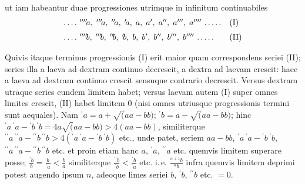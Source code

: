 ut iam habeantur duae progressiones utrimque in infinitum continuabiles
\[
\begin{array}{@{}ll@{}}
.\,.\,.\,.\ {}^{\prime\prime\prime\prime}\!a,\;{}^{\prime\prime\prime}\!a,\;{}^{\prime\prime}\!a,\;{}^{\prime}\!a,\; a,\; a',\; a'',\; a''',\; a''''\ .\,.\,.\,.\,.&\mathrm{(I)}\\[6pt]
.\,.\,.\,.\ {}^{\prime\prime\prime\prime}\!b,\;{}^{\prime\prime\prime}\!b,\;{}^{\prime\prime}\!b,\;{}^{\prime}\!b,\; b,\; b',\; b'',\; b''',\; b''''\ .\,.\,.\,.\,.&\mathrm{(II)}
\end{array}
\]
\par Quivis itaque terminus progressionis (I) erit maior quam correspondens seriei (II); series illa a laeva ad dextram continuo decrescit, a dextra ad laevam
crescit: haec a laeva ad dextram continuo crescit sensuque contrario decrescit.
Versus dextram utraque series eundem limitem habet; versus laevam autem (I)
super omnes limites crescit, (II) habet limitem $0$ (nisi omnes utriusque progressionis termini sunt aequales). Nam ${}^{\prime}\!a=a+\surd(aa-bb)$; ${}^{\prime}\!b=a-\surd(aa-bb)$;
hinc ${}^{\prime}\!a\,{}^{\prime}\!a-{}^{\prime}\!b\,{}^{\prime}\!b=4a\surd(aa-bb)>4(aa-bb)$, similiterque ${}^{\prime\prime}\!a\,\allowbreak {}^{\prime\prime}\!a-{}^{\prime\prime}\!b\,\allowbreak {}^{\prime\prime}\!b>4({}^{\prime}\!a\,\allowbreak {}^{\prime}\!a-{}^{\prime}\!b\,\allowbreak {}^{\prime}\!b)$
etc., unde patet, seriem $aa-bb$, ${}^{\prime}\!a\,{}^{\prime}\!a-{}^{\prime}\!b\,{}^{\prime}\!b$, ${}^{\prime\prime}\!a\,{}^{\prime\prime}\!a-{}^{\prime\prime}\!b\,{}^{\prime\prime}\!b$ etc. et proin etiam hanc
$a$, ${}^{\prime}\!a$, ${}^{\prime\prime}\!a$ etc. quemvis limitem superare posse; $\frac{{}^{\prime}\!b}{b}=\frac{b}{{}^{\prime}\!a}<\frac{b}{a}$ similiterque $\frac{{}^{\prime\prime}\!b}{{}^{\prime}\!b}<\frac{{}^{\prime}\!b}{{}^{\prime}\!a}$ etc.
i.\,e. $\frac{{}^{n+1}\!b}{{}^{n}\!b}$ infra quemvis limitem deprimi potest augendo ipsum $n$, adeoque limes
seriei $b$, ${}^{\prime}\!b$, ${}^{\prime\prime}\!b$ etc. $=0$.
